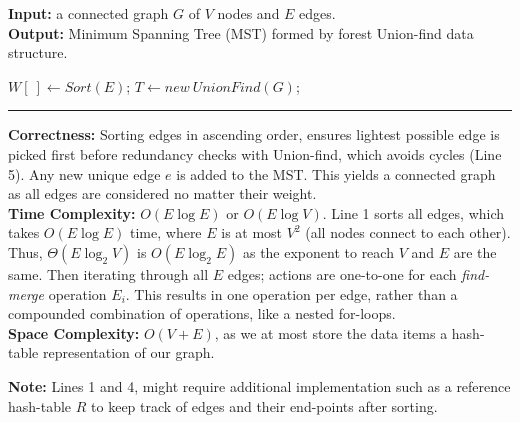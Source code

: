 \begin{Func}
    \textbf{Input:} a connected graph $G$ of $V$ nodes and $E$ edges.\\
    \textbf{Output:} Minimum Spanning Tree (MST) formed by forest Union-find data structure.\\

    \vspace{-.5em}
    \begin{algorithm}[H]
        \label{algo:prim}
        $W[\ ]\gets Sort(E)$; 
        $T\gets new \ UnionFind(G)$; 

        \vspace{.5em}
    \end{algorithm}
    \noindent\rule{\textwidth}{0.4pt}

    \noindent
    \textbf{Correctness:} Sorting edges in ascending order, ensures lightest possible edge is picked first before redundancy checks with Union-find, which avoids cycles (Line 5).
    Any new unique edge $e$ is added to the MST. This yields a connected graph as all edges are considered no matter their weight.\\
    \textbf{Time Complexity:} $O(E \log E)$ or $O(E \log V)$. Line 1 sorts all edges, which takes $O(E \log E)$ time, where $E$ is at most $V^2$ (all nodes connect to each other).
    Thus, $\Theta(E \log_2 V)$ is $O(E \log_2 E)$ as the exponent to reach $V$ and $E$ are the same. Then iterating through all $E$ edges; 
    actions are one-to-one for each \textit{find-merge} operation $E_i$. This results in one operation per edge, rather than a compounded combination of operations, like a nested for-loops.\\
    \textbf{Space Complexity:} $O(V+E)$, as we at most store the data items a hash-table representation of our graph.
\end{Func}

\noindent
\textbf{Note:} Lines 1 and 4, might require additional implementation such as a reference hash-table $R$ to keep track of edges and their end-points after sorting.

